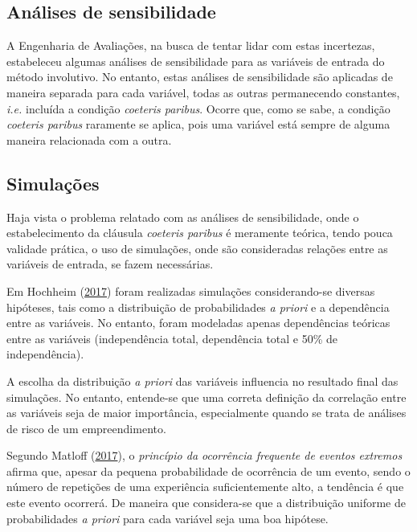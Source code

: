 \documentclass[
	12pt,				%
	oneside,			%
	a4paper,			%
	chapter=TITLE,		%
	section=TITLE,		%
	english,			%
	brazil				%
	]{abntex2}
\begin{document}
\hypertarget{anuxe1lises-de-sensibilidade}{%
\subsection{Análises de sensibilidade}\label{anuxe1lises-de-sensibilidade}}

A Engenharia de Avaliações, na busca de tentar lidar com estas incertezas,
estabeleceu algumas análises de sensibilidade para as variáveis de entrada do
método involutivo. No entanto, estas análises de sensibilidade são aplicadas
de maneira separada para cada variável, todas as outras permanecendo constantes,
\emph{i.e.} incluída a condição \emph{coeteris paribus}. Ocorre que, como se sabe, a
condição \emph{coeteris paribus} raramente se aplica, pois uma variável está
sempre de alguma maneira relacionada com a outra.

\hypertarget{simulauxe7uxf5es}{%
\subsection{Simulações}\label{simulauxe7uxf5es}}

Haja vista o problema relatado com as análises de sensibilidade, onde o
estabelecimento da cláusula \emph{coeteris paribus} é meramente teórica, tendo
pouca validade prática, o uso de simulações, onde são consideradas relações
entre as variáveis de entrada, se fazem necessárias.

Em Hochheim (\protect\hyperlink{ref-gahochheim}{2017}) foram realizadas simulações considerando-se diversas hipóteses,
tais como a distribuição de probabilidades \emph{a priori} e a dependência entre as
variáveis. No entanto, foram modeladas apenas dependências teóricas entre as
variáveis (independência total, dependência total e 50\% de independência).

A escolha da distribuição \emph{a priori} das variáveis influencia no resultado final
das simulações. No entanto, entende-se que uma correta definição da correlação
entre as variáveis seja de maior importância, especialmente quando se trata
de análises de risco de um empreendimento.

Segundo Matloff (\protect\hyperlink{ref-matloff2017}{2017}), o \emph{princípio da ocorrência frequente de eventos extremos}
afirma que, apesar da pequena probabilidade de ocorrência de um evento, sendo
o número de repetições de uma experiência suficientemente alto, a tendência é
que este evento ocorrerá. De maneira que considera-se que a distribuição
uniforme de probabilidades \emph{a priori} para cada variável seja uma boa hipótese.
\end{document}
